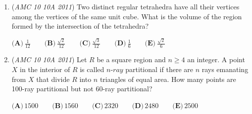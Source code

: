 \begin{enumerate}
 $\textbf{(A)}\ 37\qquad\textbf{(B)}\ 242\qquad\textbf{(C)}\ 365\qquad\textbf{(D)}\ 728\qquad\textbf{(E)}\ 998$


	\item (\textit{AMC 10 10A 2011}) Two distinct regular tetrahedra have all their vertices among the vertices of the same unit cube. What is the volume of the region formed by the intersection of the tetrahedra?


 $\textbf{(A)}\ \frac{1}{12}\qquad\textbf{(B)}\ \frac{\sqrt{2}}{12}\qquad\textbf{(C)}\ \frac{\sqrt{3}}{12}\qquad\textbf{(D)}\ \frac{1}{6}\qquad\textbf{(E)}\ \frac{\sqrt{2}}{6}$


	\item (\textit{AMC 10 10A 2011}) Let $R$ be a square region and $n\ge4$ an integer.  A point $X$ in the interior of $R$ is called $n\text{-}ray$ partitional if there are $n$ rays emanating from $X$ that divide $R$ into $n$ triangles of equal area.  How many points are 100-ray partitional but not 60-ray partitional?


 $\textbf{(A)}\,1500 \qquad\textbf{(B)}\,1560 \qquad\textbf{(C)}\,2320 \qquad\textbf{(D)}\,2480 \qquad\textbf{(E)}\,2500$


\end{enumerate}